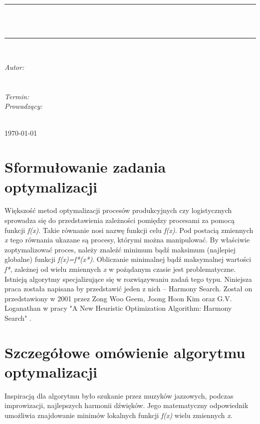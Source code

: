 \documentclass[10pt, a4paper]{article}
\begin{document}
\def\tablename{Tabela}	%
\begin{titlepage}
	\begin{center}
		\textsc{\LARGE \formakursu}\\[1cm]		
		\textsc{\Large \kurs}\\[0.5cm]		
		\rule{\textwidth}{0.08cm}\\[1cm]
		{\huge \bfseries \doctype}\\[1cm]
		\rule{\textwidth}{0.08cm}\\[1cm]
		\begin{flushright} \large
		\emph{Autor: }\\
		\osobaA\\
		\osobaB\\[0.4cm]
		\emph{Termin: }\termin\\[0.4cm]
		\emph{Prowadzący:} \\
		\prowadzacy \\
		\end{flushright}
		\vfill
		{\large \today}
	\end{center}	
\end{titlepage}
\newpage
\tableofcontents
\newpage

\section{Sformułowanie zadania optymalizacji}
\label{sec:1}
Większość metod optymalizacji procesów produkcyjnych czy logistycznych sprowadza się do przedstawienia zależności pomiędzy procesami za pomocą funkcji {\em f(x)}. Takie równanie nosi nazwę funkcji celu {\em f(x)}. Pod postacią zmiennych {\em x} tego równania ukazane są procesy, którymi można manipulować.  By właściwie zoptymalizować proces, należy znaleźć minimum bądź maksimum (najlepiej globalne) funkcji {\em f(x)=f*(x*)}. Obliczanie minimalnej bądź maksymalnej wartości {\em f*}, zależnej od wielu zmiennych {\em x} w pożądanym czasie jest problematyczne. Istnieją algorytmy specjalizujące się w  rozwiązywaniu zadań tego typu. Niniejsza praca została napisana by przedstawić jeden z nich -- Harmony Search. Został on przedstawiony w 2001 przez Zong Woo Geem, Joong Hoon Kim oraz G.V. Loganathan w pracy "A New Heuristic Optimization Algorithm: Harmony Search" \cite{bib:orginal}.

\section{Szczegółowe omówienie algorytmu optymalizacji}
\label{sec:2}
Inspiracją dla algorytmu było szukanie przez muzyków jazzowych, podczas improwizacji, najlepszych harmonii dźwięków. Jego matematyczny odpowiednik umożliwia znajdowanie minimów lokalnych funkcji {\em f(x)} wielu zmiennych {\em x}. 
\end{document}
